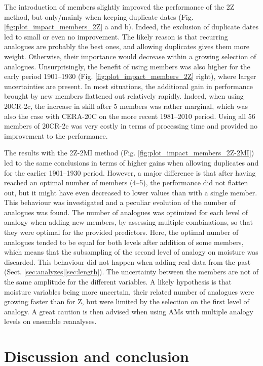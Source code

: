\documentclass{ametsoc}
\begin{document}
The introduction of members slightly improved the performance of the 2Z method, but only/mainly when keeping duplicate dates (Fig. \ref{fig:plot_impact_members_2Z} a and b). Indeed, the exclusion of duplicate dates led to small or even no improvement. The likely reason is that recurring analogues are probably the best ones, and allowing duplicates gives them more weight. Otherwise, their importance would decrease within a growing selection of analogues. Unsurprisingly, the benefit of using members was also higher for the early period 1901--1930 (Fig. \ref{fig:plot_impact_members_2Z} right), where larger uncertainties are present. In most situations, the additional gain in performance brought by new members flattened out relatively rapidly. Indeed, when using 20CR-2c, the increase in skill after 5 members was rather marginal, which was also the case with CERA-20C on the more recent 1981--2010 period. Using all 56 members of 20CR-2c was very costly in terms of processing time and provided no improvement to the performance. 

The results with the 2Z-2MI method (Fig. \ref{fig:plot_impact_members_2Z-2MI}) led to the same conclusions in terms of higher gains when allowing duplicates and for the earlier 1901--1930 period. However, a major difference is that after having reached an optimal number of members (4--5), the performance did not flatten out, but it might have even decreased to lower values than with a single member. This behaviour was investigated and a peculiar evolution of the number of analogues was found. The number of analogues was optimized for each level of analogy when adding new members, by assessing multiple combinations, so that they were optimal for the provided predictors. Here, the optimal number of analogues tended to be equal for both levels after addition of some members, which means that the subsampling of the second level of analogy on moisture was discarded. This behaviour did not happen when adding real data from the past (Sect. \ref{sec:analyzes}\ref{sec:length}). The uncertainty between the members are not of the same amplitude for the different variables. A likely hypothesis is that moisture variables being more uncertain, their related number of analogues were growing faster than for Z, but were limited by the selection on the first level of analogy. A great caution is then advised when using AMs with multiple analogy levels on ensemble reanalyses.


\section{Discussion and conclusion}
\label{sec:discussion-conclusion}
\end{document}
